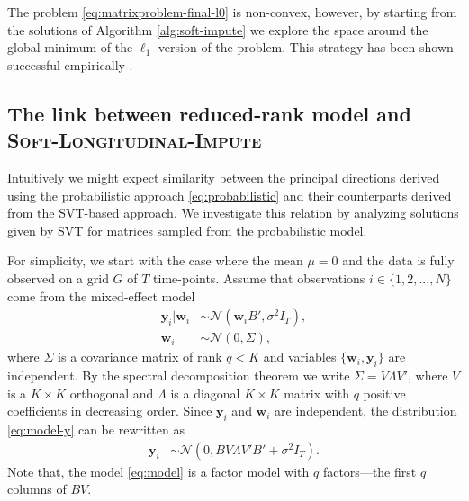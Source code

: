 \documentclass[preprint]{imsart}
\numberwithin{equation}{section}
\theoremstyle{plain}
\newcommand{\cN}{\mathcal{N}}
\newcommand{\by}{\mathbf{y}}
\newcommand{\bw}{\mathbf{w}}
\begin{document}
The problem \eqref{eq:matrixproblem-final-l0} is non-convex, however, by starting from the solutions of Algorithm \ref{alg:soft-impute} we explore the space around the global minimum of the $\ell_1$ version of the problem. This strategy has been shown successful empirically \citep{ge2016matrix}.


\subsection{The link between reduced-rank model and \textsc{Soft-Longitudinal-Impute}}\label{s:the-link}


Intuitively we might expect similarity between the principal directions derived using the probabilistic approach \eqref{eq:probabilistic} and their counterparts derived from the SVT-based approach. We investigate this relation by analyzing solutions given by SVT for matrices sampled from the probabilistic model.

For simplicity, we start with the case where the mean $\mu = 0$ and the data is fully observed on a grid $G$ of $T$ time-points. Assume that observations $i \in \{1,2,...,N\}$ come from the mixed-effect model
\begin{align}
  \by_i | \bw_i &\sim \cN(\bw_i B', \sigma^2 I_T), \label{eq:model-y}\\
  \bw_i &\sim \cN(0 , \Sigma), \nonumber%
\end{align}
%
where $\Sigma$ is a covariance matrix of rank $q < K$ and variables $\{\bw_i, \by_i\}$ are independent. By the spectral decomposition theorem we write $\Sigma = V\Lambda V'$, where $V$ is a $K\times K$ orthogonal and $\Lambda$ is a diagonal $K\times K$ matrix with $q$ positive coefficients in decreasing order.
Since $\by_i$ and $\bw_i$ are independent, the distribution \eqref{eq:model-y} can be rewritten as
\begin{align}
  \by_i &\sim \cN(0, B V \Lambda V'  B' + \sigma^2 I_T). \label{eq:model}
\end{align}
Note that, the model \eqref{eq:model} is a factor model with $q$ factors---the first $q$ columns of $BV$.
\end{document}
